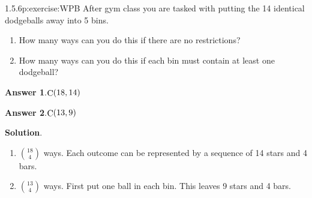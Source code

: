 \documentclass[twoside,11pt,]{book}
\newcommand{\blocktitlefont}{\relax}
\numberwithin{equation}{chapter}
\begin{document}
\begin{divisionsolution}{1.5.6}{}{p:exercise:WPB}%
After gym class you are tasked with putting the 14 identical dodgeballs away into 5 bins.%
\begin{enumerate}[label=(\alph*)]
\item{}How many ways can you do this if there are no restrictions?%
\item{}How many ways can you do this if each bin must contain at least one dodgeball?%
\end{enumerate}
%
\par\smallskip%
\noindent\textbf{\blocktitlefont Answer 1}.\quad{}\(\mathop{\rm C}\nolimits\!\left(18,14\right)\)%
\par\smallskip%
\noindent\textbf{\blocktitlefont Answer 2}.\quad{}\(\mathop{\rm C}\nolimits\!\left(13,9\right)\)%
\par\smallskip%
\noindent\textbf{\blocktitlefont Solution}.\quad{}%
\begin{enumerate}[label=(\alph*)]
\item{}\({18 \choose 4}\) ways. Each outcome can be represented by a sequence of 14 stars and 4 bars.%
\item{}\({13 \choose 4}\) ways. First put one ball in each bin. This leaves 9 stars and 4 bars.%
\end{enumerate}
%
\end{divisionsolution}%
\end{document}
